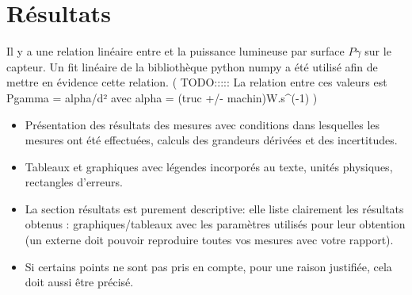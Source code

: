 \section{Résultats}

Il y a une relation linéaire entre  et la puissance lumineuse par surface \(P\gamma\) sur le capteur. Un fit linéaire de la bibliothèque python numpy a été utilisé afin de mettre en évidence cette relation.
(  TODO:::::  La relation entre ces valeurs est Pgamma = alpha/d² avec alpha = (truc +/- machin)W.s^(-1)   )





\begin{itemize}
\item Présentation des résultats des mesures avec conditions dans lesquelles les mesures ont été effectuées, calculs des grandeurs dérivées et des incertitudes.
\item Tableaux et graphiques avec légendes incorporés au texte, unités physiques, rectangles d'erreurs.
\item La section résultats est purement descriptive: elle liste clairement les résultats obtenus : graphiques/tableaux avec les paramètres utilisés pour leur obtention (un externe doit pouvoir reproduire toutes vos mesures avec votre rapport).
\item Si certains points ne sont pas pris en compte, pour une raison justifiée, cela doit aussi être précisé.
\end{itemize}